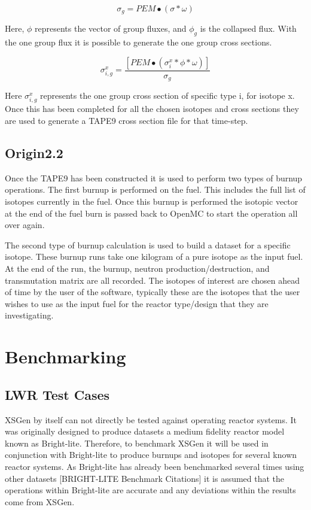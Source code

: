 \documentclass{article}
\begin{document}
$$\sigma_g = PEM ∙(\sigma*\omega)$$

Here, \begin{math}\phi\end{math} represents the vector of group fluxes, and $\phi_g$ is the collapsed flux. With the one group flux it is possible to generate the one group cross sections. 

$$\sigma_{i,g}^x=\frac{[PEM∙(\sigma_i^x*\phi*\omega)]}{\sigma_g} $$

Here $\sigma_{i,g}^x$ represents the one group cross section of specific type i, for isotope x. Once this has been completed for all the chosen isotopes and cross sections they are used to generate a TAPE9 cross section file for that time-step. 

\subsection{Origin2.2}
Once the TAPE9 has been constructed it is used to perform two types of burnup operations. The first burnup is performed on the fuel. This includes the full list of isotopes currently in the fuel. Once this burnup is performed the isotopic vector at the end of the fuel burn is passed back to OpenMC to start the operation all over again.  

The second type of burnup calculation is used to build a dataset for a specific isotope. These burnup runs take one kilogram of a pure isotope as the input fuel. At the end of the run, the burnup, neutron production/destruction, and transmutation matrix are all recorded. The isotopes of interest are chosen ahead of time by the user of the software, typically these are the isotopes that the user wishes to use as the input fuel for the reactor type/design that they are investigating. 

\section{Benchmarking}
\subsection{LWR Test Cases}
XSGen by itself can not directly be tested against operating reactor systems. It was originally designed to produce datasets a medium fidelity reactor model known as Bright-lite. Therefore, to benchmark XSGen it will be used in conjunction with Bright-lite to produce burnups and isotopes for several known reactor systems.  As Bright-lite has already been benchmarked several times using other datasets [BRIGHT-LITE Benchmark Citations] it is assumed that the operations within Bright-lite are accurate and any deviations within the results come from XSGen. 
\end{document}
